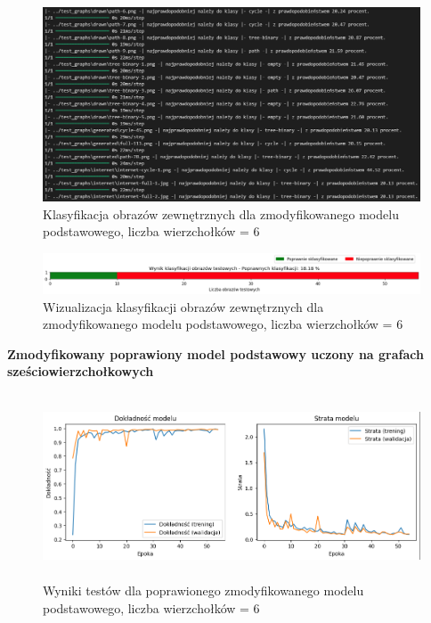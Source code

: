 \begin{figure}[ht]
	\centering
	\includegraphics[width=14cm]{resources/tests/images/v4/base6_1_txt.png}
	\caption{Klasyfikacja obrazów zewnętrznych dla zmodyfikowanego modelu podstawowego, liczba wierzchołków = 6}
	\label{Fig:tests-base-5b}
\end{figure}
\FloatBarrier

\begin{figure}[ht]
	\centering
	\includegraphics[width=14cm]{resources/tests/images/v4/base6_1_bar.png}
	\caption{Wizualizacja klasyfikacji obrazów zewnętrznych dla zmodyfikowanego modelu podstawowego, liczba wierzchołków = 6}
	\label{Fig:tests-base-5c}
\end{figure}
\FloatBarrier


\textbf{Zmodyfikowany poprawiony model podstawowy uczony na grafach sześciowierzchołkowych}




\begin{figure}[ht]
	\centering
	\includegraphics[height=5.5cm]{resources/tests/images/v4/base6_1_1_img.png}
	\caption{Wyniki testów dla poprawionego zmodyfikowanego modelu podstawowego, liczba wierzchołków = 6}
	\label{Fig:tests-base-6a}
\end{figure}
\FloatBarrier


